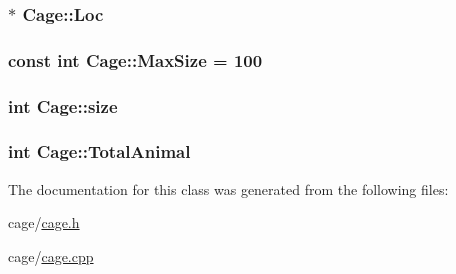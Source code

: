 \subsubsection[{\texorpdfstring{Loc}{Loc}}]{$\ast$ Cage\+::\+Loc\hspace{0.3cm}{\ttfamily [private]}}\hypertarget{classCage_a7712bc324e5caed92541ba32715b6090}{}\label{classCage_a7712bc324e5caed92541ba32715b6090}
\subsubsection[{\texorpdfstring{Max\+Size}{MaxSize}}]{\setlength{\rightskip}{0pt plus 5cm}const int Cage\+::\+Max\+Size = 100\hspace{0.3cm}{\ttfamily [private]}}\hypertarget{classCage_ae5023dd45202e149e5b6321699a85923}{}\label{classCage_ae5023dd45202e149e5b6321699a85923}
\subsubsection[{\texorpdfstring{size}{size}}]{\setlength{\rightskip}{0pt plus 5cm}int Cage\+::size\hspace{0.3cm}{\ttfamily [private]}}\hypertarget{classCage_a7cd8d649b27803c0a73410d56e54a7a9}{}\label{classCage_a7cd8d649b27803c0a73410d56e54a7a9}
\subsubsection[{\texorpdfstring{Total\+Animal}{TotalAnimal}}]{\setlength{\rightskip}{0pt plus 5cm}int Cage\+::\+Total\+Animal\hspace{0.3cm}{\ttfamily [private]}}\hypertarget{classCage_a54e4bd8f133dede67af5f6557b22a514}{}\label{classCage_a54e4bd8f133dede67af5f6557b22a514}


The documentation for this class was generated from the following files\+:\begin{DoxyCompactItemize}
\item 
cage/\hyperlink{cage_8h}{cage.\+h}\item 
cage/\hyperlink{cage_8cpp}{cage.\+cpp}\end{DoxyCompactItemize}
